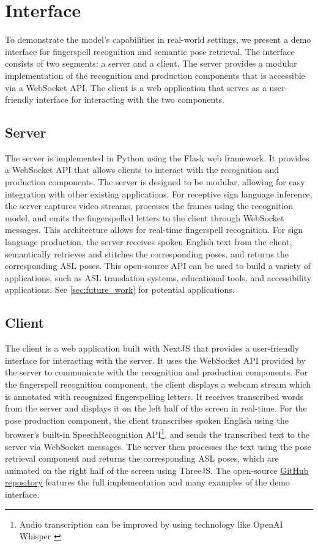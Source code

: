 \documentclass[../paper.tex]{subfiles}
\begin{document}
\section{Interface}
To demonstrate the model's capabilities in real-world settings, we present a demo interface for fingerspell recognition and semantic pose retrieval. The interface consists of two segments: a server and a client. The server provides a modular implementation of the recognition and production components that is accessible via a WebSocket API. The client is a web application that serves as a user-friendly interface for interacting with the two components.

\subsection{Server}
The server is implemented in Python using the Flask web framework. It provides a WebSocket API that allows clients to interact with the recognition and production components. The server is designed to be modular, allowing for easy integration with other existing applications. For receptive sign language inference, the server captures video streams, processes the frames using the recognition model, and emits the fingerspelled letters to the client through WebSocket messages. This architecture allows for real-time fingerspell recognition. For sign language production, the server receives spoken English text from the client, semantically retrieves and stitches the corresponding poses, and returns the corresponding ASL poses. This open-source API can be used to build a variety of applications, such as ASL translation systems, educational tools, and accessibility applications. See \autoref{sec:future_work} for potential applications.

\subsection{Client}
The client is a web application built with NextJS that provides a user-friendly interface for interacting with the server. It uses the WebSocket API provided by the server to communicate with the recognition and production components. For the fingerspell recognition component, the client displays a webcam stream which is annotated with recognized fingerspelling letters. It receives transcribed words from the server and displays it on the left half of the screen in real-time. For the pose production component, the client transcribes spoken English using the browser's built-in SpeechRecognition API\footnote{Audio transcription can be improved by using technology like OpenAI Whisper \cite{whisper}}, and sends the transcribed text to the server via WebSocket messages. The server then processes the text using the pose retrieval component and returns the corresponding ASL poses, which are animated on the right half of the screen using ThreeJS. The open-source \href{https://github.com/kevinjosethomas/sign-language-processing}{GitHub repository} features the full implementation and many examples of the demo interface.
\end{document}
